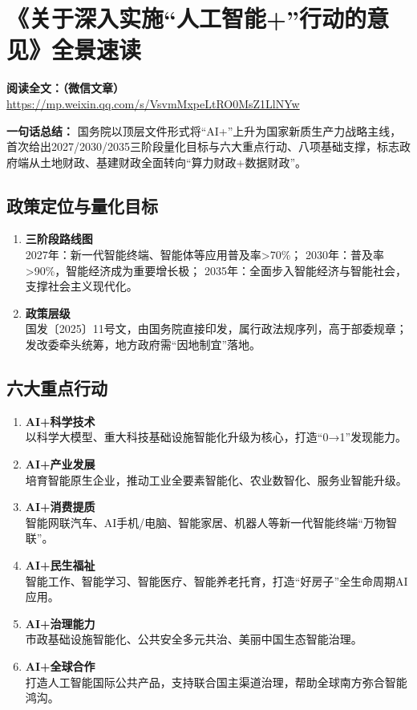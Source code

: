 \clearpage

\section{《关于深入实施“人工智能+”行动的意见》全景速读}
\vspace{1cm}
\noindent\textbf{阅读全文：（微信文章）} \url{https://mp.weixin.qq.com/s/VsvmMxpeLtRO0MsZ1LlNYw}

\textbf{一句话总结：}  
国务院以顶层文件形式将“AI+”上升为国家新质生产力战略主线，首次给出2027/2030/2035三阶段量化目标与六大重点行动、八项基础支撑，标志政府端从土地财政、基建财政全面转向“算力财政+数据财政”。

\subsection{政策定位与量化目标}
\begin{enumerate}[leftmargin=*, nosep]
    \item \textbf{三阶段路线图}  \\
    2027年：新一代智能终端、智能体等应用普及率>70\%；  
    2030年：普及率>90\%，智能经济成为重要增长极；  
    2035年：全面步入智能经济与智能社会，支撑社会主义现代化。
    \item \textbf{政策层级}  \\
    国发〔2025〕11号文，由国务院直接印发，属行政法规序列，高于部委规章；发改委牵头统筹，地方政府需“因地制宜”落地。
\end{enumerate}

\subsection{六大重点行动}
\begin{enumerate}[leftmargin=*, nosep]
    \item \textbf{AI+科学技术}  \\
    以科学大模型、重大科技基础设施智能化升级为核心，打造“0→1”发现能力。
    \item \textbf{AI+产业发展}  \\
    培育智能原生企业，推动工业全要素智能化、农业数智化、服务业智能升级。
    \item \textbf{AI+消费提质}  \\
    智能网联汽车、AI手机/电脑、智能家居、机器人等新一代智能终端“万物智联”。
    \item \textbf{AI+民生福祉}  \\
    智能工作、智能学习、智能医疗、智能养老托育，打造“好房子”全生命周期AI应用。
    \item \textbf{AI+治理能力}  \\
    市政基础设施智能化、公共安全多元共治、美丽中国生态智能治理。
    \item \textbf{AI+全球合作}  \\
    打造人工智能国际公共产品，支持联合国主渠道治理，帮助全球南方弥合智能鸿沟。
\end{enumerate}

